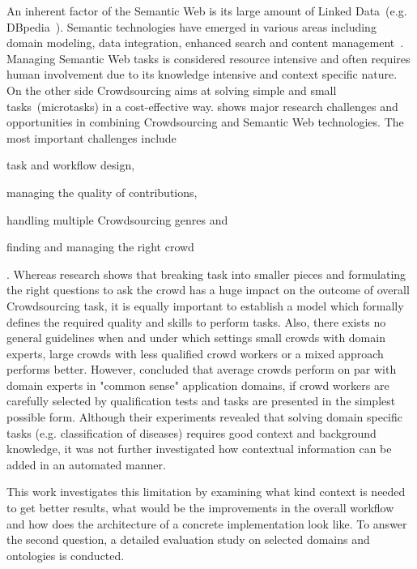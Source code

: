 \documentclass[12pt, notitlepage]{article}
\begin{document}
An inherent factor of the Semantic Web is its large amount of Linked Data~(e.g. DBpedia~\cite{lehmann2015dbpedia}). Semantic technologies have emerged in various areas including domain modeling, data integration, enhanced search and content management~\cite{semantic-web-usecases}. Managing Semantic Web tasks is considered resource intensive and often requires human involvement due to its knowledge intensive and context specific nature. On the other side Crowdsourcing aims at solving simple and small tasks~(microtasks) in a cost-effective way. \citet{sarasua2015crowdsourcing} shows major research challenges and opportunities in combining Crowdsourcing and Semantic Web technologies. The most important challenges include 
\begin{inparaenum}[1)]
		\item task and workflow design,
		\item managing the quality of contributions,
		\item handling multiple Crowdsourcing genres and 
		\item finding and managing the right crowd
\end{inparaenum}.
Whereas research shows that breaking task into smaller pieces and formulating the right questions to ask the crowd has a huge impact on the outcome of overall Crowdsourcing task, it is equally important to establish a model which formally defines the required quality and skills to perform tasks. Also, there exists no general guidelines when and under which settings small crowds with domain experts, large crowds with less qualified crowd workers or a mixed approach performs better. However, \citet{mortensen2013developing} concluded that average crowds perform on par with domain experts in "common sense" application domains, if crowd workers are carefully selected by qualification tests and tasks are presented in the simplest possible form. Although their experiments revealed that solving domain specific tasks (e.g. classification of diseases) requires good context and background knowledge, it was not further investigated how contextual information can be added in an automated manner. 

This work investigates this limitation by examining what kind context is needed to get better results, what would be the improvements in the overall workflow and how does the architecture of a concrete implementation look like. To answer the second question, a detailed evaluation study on selected domains and ontologies is conducted.
\end{document}
